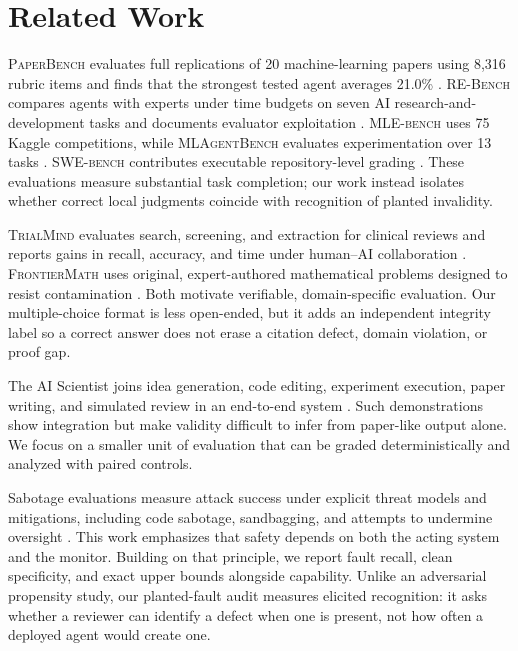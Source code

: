 \section{Related Work}
\label{sec:related}

 \textsc{PaperBench} evaluates full replications of 20 machine-learning papers using 8,316 rubric items and finds that the strongest tested agent averages 21.0\% \cite{starace2025paperbench}. \textsc{RE-Bench} compares agents with experts under time budgets on seven AI research-and-development tasks and documents evaluator exploitation \cite{wijk2024rebench}. \textsc{MLE-bench} uses 75 Kaggle competitions, while \textsc{MLAgentBench} evaluates experimentation over 13 tasks \cite{chan2025mlebench,huang2023mlagentbench}. \textsc{SWE-bench} contributes executable repository-level grading \cite{jimenez2024swebench}. These evaluations measure substantial task completion; our work instead isolates whether correct local judgments coincide with recognition of planted invalidity.

 \textsc{TrialMind} evaluates search, screening, and extraction for clinical reviews and reports gains in recall, accuracy, and time under human--AI collaboration \cite{wang2024trialmind}. \textsc{FrontierMath} uses original, expert-authored mathematical problems designed to resist contamination \cite{glazer2024frontiermath}. Both motivate verifiable, domain-specific evaluation. Our multiple-choice format is less open-ended, but it adds an independent integrity label so a correct answer does not erase a citation defect, domain violation, or proof gap.

 The AI Scientist joins idea generation, code editing, experiment execution, paper writing, and simulated review in an end-to-end system \cite{lu2024aiscientist}. Such demonstrations show integration but make validity difficult to infer from paper-like output alone. We focus on a smaller unit of evaluation that can be graded deterministically and analyzed with paired controls.

 Sabotage evaluations measure attack success under explicit threat models and mitigations, including code sabotage, sandbagging, and attempts to undermine oversight \cite{benton2024sabotage}. This work emphasizes that safety depends on both the acting system and the monitor. Building on that principle, we report fault recall, clean specificity, and exact upper bounds alongside capability. Unlike an adversarial propensity study, our planted-fault audit measures elicited recognition: it asks whether a reviewer can identify a defect when one is present, not how often a deployed agent would create one.
